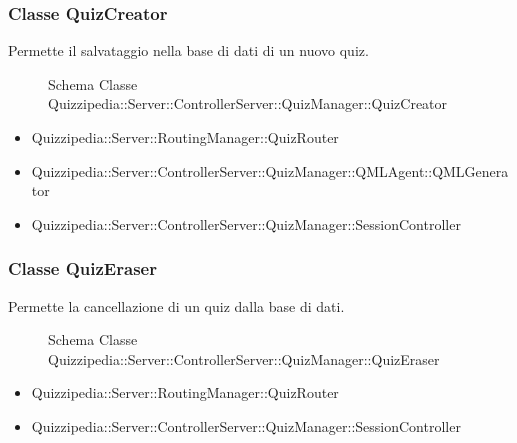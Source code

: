 \subsubsection{Classe QuizCreator}
Permette il salvataggio nella base di dati di un nuovo quiz.
\begin{figure}[H]
\centering
\noindent{}
\caption{Schema Classe Quizzipedia::Server::ControllerServer::QuizManager::QuizCreator}
\end{figure}
\begin{itemize}
\item Quizzipedia::Server::RoutingManager::QuizRouter
\end{itemize}
\begin{itemize}
\item Quizzipedia::Server::ControllerServer::QuizManager::QMLAgent::QMLGenerator
\item Quizzipedia::Server::ControllerServer::QuizManager::SessionController
\end{itemize}
\subsubsection{Classe QuizEraser}
Permette la cancellazione di un quiz dalla base di dati.
\begin{figure}[H]
\centering
\noindent{}
\caption{Schema Classe Quizzipedia::Server::ControllerServer::QuizManager::QuizEraser}
\end{figure}
\begin{itemize}
\item Quizzipedia::Server::RoutingManager::QuizRouter
\end{itemize}
\begin{itemize}
\item Quizzipedia::Server::ControllerServer::QuizManager::SessionController
\end{itemize}
